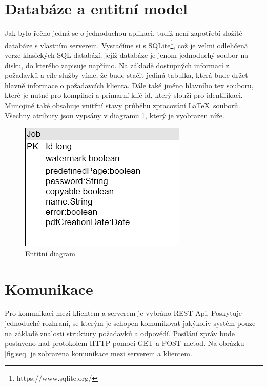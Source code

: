 \section{Databáze a entitní model}
 Jak bylo řečno jedná se o jednoduchou aplikaci, tudíž není zapotřebí složité databáze s vlastním serverem. Vystačíme si s SQLite\footnote{https://www.sqlite.org/}, což je velmi odlehčená verze klasických SQL databází, jejíž databáze je jenom jednoduchý soubor na disku, do kterého zapisuje napřímo. 
 Na základě dostupných informací z požadavků a cíle služby víme, že bude stačit jediná tabulka, která bude držet hlavně informace o požadavcích klienta. Dále také jméno hlavního tex souboru, které je nutné pro kompilaci a primarní klíč id, který slouží pro identifikaci. Mimojiné také obsahuje vnitřní stavy průběhu zpracování \LaTeX\ souborů. Všechny atributy jsou vypsány v diagramu \ref{fig:entities}, který je vyobrazen níže.
 
  \begin{figure}[H]
  	\includegraphics[scale=0.5]{entities}
  	\centering
  	\caption{Entitní diagram}
  	\label{fig:entities}
  \end{figure}

\section{Komunikace}
Pro komunikaci mezi klientem a serverem je vybráno REST Api. Poskytuje jednoduché rozhraní, se kterým je schopen komunikovat jakýkoliv systém pouze na základě znalosti struktury požadavků a odpovědí. Posílání zpráv bude postaveno nad protokolem HTTP pomocí GET a POST metod. Na obrázku \ref{fig:seq} je zobrazena komunikace mezi serverem a klientem. 


